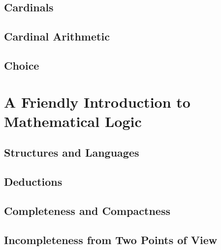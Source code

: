 \documentclass[12pt,oneside]{book}
\theoremstyle{definition}
\begin{document}
\chapter{Cardinals}


\chapter{Cardinal Arithmetic}


\chapter{Choice}



\part*{A Friendly Introduction to Mathematical Logic}
\setcounter{chapter}{0}
\renewcommand*{\theHchapter}{02\the\value{chapter}}

\chapter{Structures and Languages}


\chapter{Deductions}


\chapter{Completeness and Compactness}


\chapter{Incompleteness from Two Points of View}

\end{document}
